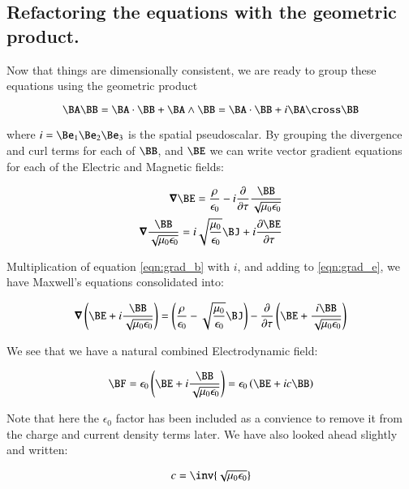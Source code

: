 \documentclass{article}
\newcommand{\spacegrad}[0]{\boldsymbol{\nabla}}
\begin{document}
\subsection{ Refactoring the equations with the geometric product. }

Now that things are dimensionally consistent, we are ready to group these equations using the geometric product

\begin{equation}
\BA \BB = \BA \cdot \BB + \BA \wedge \BB = \BA \cdot \BB + i \BA \cross \BB
\end{equation}

where $i = \Be_1\Be_2\Be_3$ is the spatial pseudoscalar.  By grouping the divergence and curl terms for each of $\BB$, and $\BE$ we can write vector gradient equations
for each of the Electric and Magnetic fields:

\begin{align}
\spacegrad \BE = \frac{\rho}{\epsilon_0} - i \frac{\partial}{\partial \tau} \frac{\BB}{\sqrt{\mu_0\epsilon_0}} \label{eqn:grad_e} \\
\spacegrad \frac{\BB}{\sqrt{\mu_0\epsilon_0}} = i\sqrt{\frac{\mu_0}{\epsilon_0}} \BJ + i\frac{\partial \BE}{\partial \tau} \label{eqn:grad_b}
\end{align}

Multiplication of equation \ref{eqn:grad_b} with $i$, and adding to \ref{eqn:grad_e}, we have Maxwell's equations consolidated into:

\begin{equation}\label{eqn:maxwelleb}
\spacegrad \left(\BE + i \frac{\BB}{\sqrt{\mu_0\epsilon_0}}\right) =
\left(\frac{\rho}{\epsilon_0} - \sqrt{\frac{\mu_0}{\epsilon_0}} \BJ\right)
- \frac{\partial}{\partial \tau} \left(\BE + \frac{i\BB}{\sqrt{\mu_0\epsilon_0}} \right)
\end{equation}

We see that we have a natural combined Electrodynamic field:

\begin{equation}
\BF = \epsilon_0\left(\BE + i \frac{\BB}{\sqrt{\mu_0\epsilon_0}}\right) = \epsilon_0\left(\BE + i c \BB\right)
\end{equation}

Note that here the $\epsilon_0$ factor has been included as a convience to remove it from the charge and current density terms later.  We have also looked ahead slightly and written:

\begin{equation}
c = \inv{\sqrt{\mu_0\epsilon_0}}
\end{equation}
\end{document}
